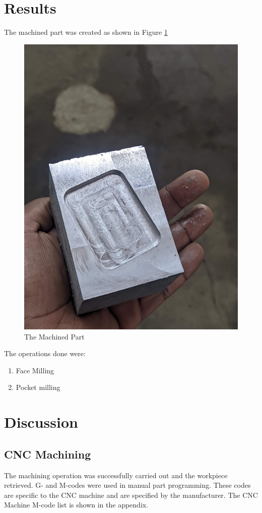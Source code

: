 \section{Results}
The machined part was created as shown in Figure \ref{fig:result}
\begin{figure}[h!]
	\centering
	\includegraphics[width=0.8\linewidth]{Figures/result}
	\caption[Result]{The Machined Part}
	\label{fig:result}
\end{figure}
The operations done were:
\begin{enumerate}
	\item Face Milling
	\item Pocket milling
\end{enumerate}

\section{Discussion}
\subsection{CNC Machining}
The machining operation was successfully carried out and the workpiece retrieved. G- and M-codes were used in manual part programming. These codes are specific to the CNC machine and are specified by the manufacturer. The CNC Machine M-code list is shown in the appendix.\\